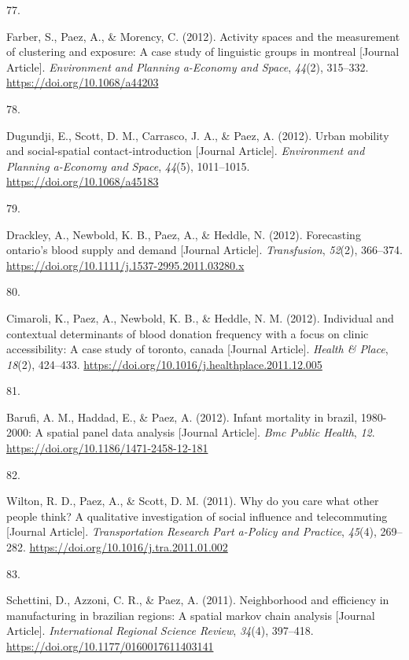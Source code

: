 \documentclass[10pt,a4paper,]{twentysecondcv}
\newlength{\csllabelwidth}
\newcommand{\CSLLeftMargin}[1]{\parbox[t]{\csllabelwidth}{#1}}
\newcommand{\CSLRightInline}[1]{\parbox[t]{\linewidth - \csllabelwidth}{#1}}
\begin{document}
\leavevmode{}%
\CSLLeftMargin{77. }%
\CSLRightInline{Farber, S., Paez, A., \& Morency, C. (2012). Activity
spaces and the measurement of clustering and exposure: A case study of
linguistic groups in montreal {[}Journal Article{]}. \emph{Environment
and Planning a-Economy and Space}, \emph{44}(2), 315--332.
\url{https://doi.org/10.1068/a44203}}

\leavevmode{}%
\CSLLeftMargin{78. }%
\CSLRightInline{Dugundji, E., Scott, D. M., Carrasco, J. A., \& Paez, A.
(2012). Urban mobility and social-spatial contact-introduction
{[}Journal Article{]}. \emph{Environment and Planning a-Economy and
Space}, \emph{44}(5), 1011--1015. \url{https://doi.org/10.1068/a45183}}

\leavevmode{}%
\CSLLeftMargin{79. }%
\CSLRightInline{Drackley, A., Newbold, K. B., Paez, A., \& Heddle, N.
(2012). Forecasting ontario's blood supply and demand {[}Journal
Article{]}. \emph{Transfusion}, \emph{52}(2), 366--374.
\url{https://doi.org/10.1111/j.1537-2995.2011.03280.x}}

\leavevmode{}%
\CSLLeftMargin{80. }%
\CSLRightInline{Cimaroli, K., Paez, A., Newbold, K. B., \& Heddle, N. M.
(2012). Individual and contextual determinants of blood donation
frequency with a focus on clinic accessibility: A case study of toronto,
canada {[}Journal Article{]}. \emph{Health \& Place}, \emph{18}(2),
424--433. \url{https://doi.org/10.1016/j.healthplace.2011.12.005}}

\leavevmode{}%
\CSLLeftMargin{81. }%
\CSLRightInline{Barufi, A. M., Haddad, E., \& Paez, A. (2012). Infant
mortality in brazil, 1980-2000: A spatial panel data analysis {[}Journal
Article{]}. \emph{Bmc Public Health}, \emph{12}.
\url{https://doi.org/10.1186/1471-2458-12-181}}

\leavevmode{}%
\CSLLeftMargin{82. }%
\CSLRightInline{Wilton, R. D., Paez, A., \& Scott, D. M. (2011). Why do
you care what other people think? A qualitative investigation of social
influence and telecommuting {[}Journal Article{]}. \emph{Transportation
Research Part a-Policy and Practice}, \emph{45}(4), 269--282.
\url{https://doi.org/10.1016/j.tra.2011.01.002}}

\leavevmode{}%
\CSLLeftMargin{83. }%
\CSLRightInline{Schettini, D., Azzoni, C. R., \& Paez, A. (2011).
Neighborhood and efficiency in manufacturing in brazilian regions: A
spatial markov chain analysis {[}Journal Article{]}. \emph{International
Regional Science Review}, \emph{34}(4), 397--418.
\url{https://doi.org/10.1177/0160017611403141}}
\end{document}
